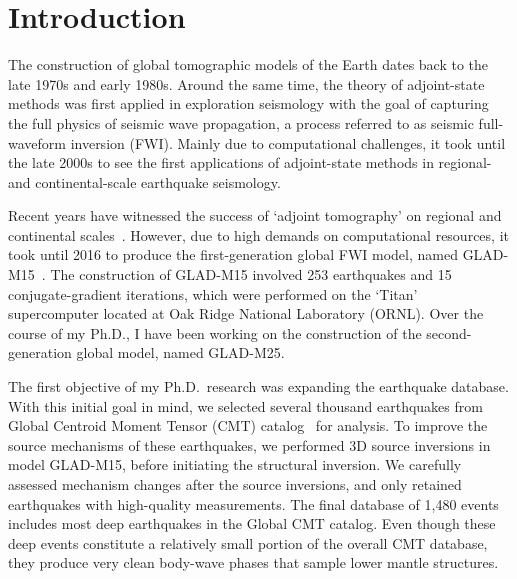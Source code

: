 \chapter{Introduction\label{ch:intro}}

The construction of global tomographic models of the Earth
dates back to the late 1970s and early 1980s.
Around the same time, the theory of adjoint-state methods was
first applied in exploration seismology with the goal of
capturing the full physics of seismic wave propagation,
a process referred to as seismic full-waveform inversion (FWI).
Mainly due to computational challenges, it took until the late
2000s to see the first applications of adjoint-state methods
in regional- and continental-scale earthquake seismology.

Recent years have witnessed the success of `adjoint tomography' on regional and continental scales~\cite{tape2009adjoint, zhu2012structure,chen2015multiparameter}.
However, due to high demands on computational resources,
it took until 2016 to produce the first-generation global FWI model, named
GLAD-M15~\cite{bozdaug2016global}.
The construction of GLAD-M15 involved 253 earthquakes and
15 conjugate-gradient iterations, which were performed
on the `Titan' supercomputer located at Oak Ridge National Laboratory (ORNL).
Over the course of my Ph.D.,
I have been working on the construction of the second-generation global model, named GLAD-M25.

The first objective of my Ph.D.\ research was expanding the earthquake database.
With this initial goal in mind,
we selected several thousand earthquakes from Global Centroid Moment Tensor (CMT) catalog~\cite{ekstrom2012global} for analysis.
To improve the source mechanisms of these earthquakes,
we performed 3D source inversions in model GLAD-M15,
before initiating the structural inversion.
We carefully assessed mechanism changes
after the source inversions,
and only retained earthquakes with high-quality measurements.
The final database of 1,480 events includes most deep earthquakes in the Global CMT catalog.
Even though these deep events constitute a relatively small portion of
the overall CMT database, they produce very clean body-wave phases
that sample lower mantle structures.

